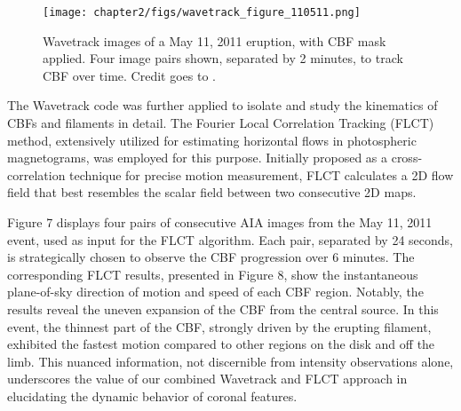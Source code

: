 \begin{figure}
	\centering
	\texttt{[image: chapter2/figs/wavetrack\_figure\_110511.png]}
	\caption{Wavetrack images of a May 11, 2011 eruption, with CBF mask applied. Four image pairs shown, separated by 2 minutes, to track CBF over time. Credit goes to \citet{stepanyuk_2022}.}
	\label{fig_wavetrack_cbf_center}
\end{figure}

The Wavetrack code was further applied to isolate and study the kinematics of CBFs and filaments in detail. The Fourier Local Correlation Tracking (FLCT) method, extensively utilized for estimating horizontal flows in photospheric magnetograms, was employed for this purpose. Initially proposed as a cross-correlation technique for precise motion measurement, FLCT calculates a 2D flow field that best resembles the scalar field between two consecutive 2D maps.

Figure 7 displays four pairs of consecutive AIA images from the May 11, 2011 event, used as input for the FLCT algorithm. Each pair, separated by 24 seconds, is strategically chosen to observe the CBF progression over 6 minutes. The corresponding FLCT results, presented in Figure 8, show the instantaneous plane-of-sky direction of motion and speed of each CBF region. Notably, the results reveal the uneven expansion of the CBF from the central source. In this event, the thinnest part of the CBF, strongly driven by the erupting filament, exhibited the fastest motion compared to other regions on the disk and off the limb. This nuanced information, not discernible from intensity observations alone, underscores the value of our combined Wavetrack and FLCT approach in elucidating the dynamic behavior of coronal features.

